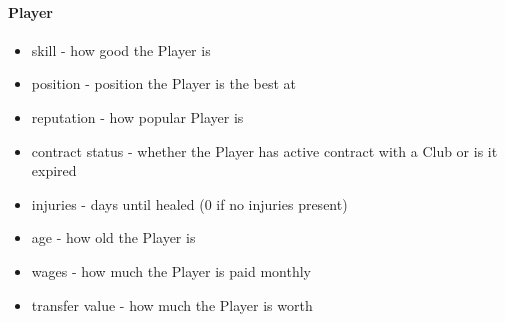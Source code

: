 \documentclass{report}
\begin{document}
\paragraph{Player}
\begin{itemize}
    \item skill - how good the Player is
    \item position - position the Player is the best at
    \item reputation - how popular Player is
    \item contract status - whether the Player has active contract with a Club or is it expired
    \item injuries - days until healed (0 if no injuries present)
    \item age - how old the Player is
    \item wages - how much the Player is paid monthly
    \item transfer value - how much the Player is worth
\end{itemize}
\end{document}
